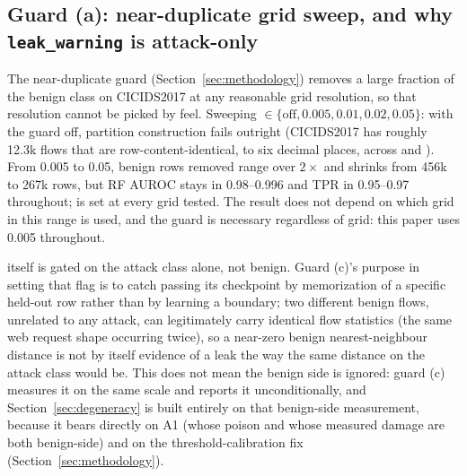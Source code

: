 \subsection{Guard (a): near-duplicate grid sweep, and why \texorpdfstring{\texttt{leak\_warning}}{leak\_warning} is attack-only}
The near-duplicate guard (Section~\ref{sec:methodology}) removes a large fraction of the benign
class on CICIDS2017 at any reasonable grid resolution, so that resolution cannot be picked by
feel. Sweeping  $\in \{\text{off}, 0.005, 0.01, 0.02, 0.05\}$: with the
guard off, partition construction fails outright (CICIDS2017 has roughly 12.3k flows that are
row-content-identical, to six decimal places, across  and
). From 0.005 to 0.05, benign rows removed range over $2\times$ and
 shrinks from 456k to 267k rows, but RF AUROC stays in 0.98--0.996 and TPR in
0.95--0.97 throughout;  is set at every grid tested. The result does not
depend on which grid in this range is used, and the guard is necessary regardless of grid: this
paper uses 0.005 throughout.

 itself is gated on the attack class alone, not benign. Guard (c)'s purpose
in setting that flag is to catch  passing its checkpoint by memorization of a specific
held-out row rather than by learning a boundary; two different benign flows, unrelated to any
attack, can legitimately carry identical flow statistics (the same web request shape occurring
twice), so a near-zero benign nearest-neighbour distance is not by itself evidence of a leak the
way the same distance on the attack class would be. This does not mean the benign side is
ignored: guard (c) measures it on the same scale and reports it unconditionally, and
Section~\ref{sec:degeneracy} is built entirely on that benign-side measurement, because it bears
directly on A1 (whose poison and whose measured damage are both benign-side) and on the
threshold-calibration fix (Section~\ref{sec:methodology}).

